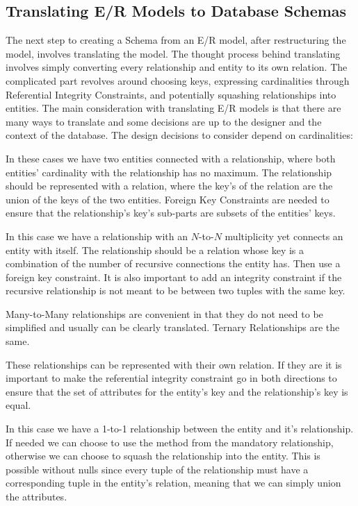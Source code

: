 \documentclass{report}
\begin{document}
\subsection{Translating E/R Models to Database Schemas}

The next step to creating a Schema from an E/R model, after restructuring the model, involves translating the model. The thought process behind translating involves simply converting every relationship and entity to its own relation. The complicated part revolves around choosing keys, expressing cardinalities through Referential Integrity Constraints, and potentially squashing relationships into entities. The main consideration with translating E/R models is that there are many ways to translate and some decisions are up to the designer and the context of the database. The design decisions to consider depend on cardinalities:

\begin{description}
    \item [Many-to-Many Relationships:] In these cases we have two entities connected with a relationship, where both entities' cardinality with the relationship has no maximum. The relationship should be represented with a relation, where the key's of the relation are the union of the keys of the two entities. Foreign Key Constraints are needed to ensure that the relationship's key's sub-parts are subsets of the entities' keys. 
    \item [Many-to-Many Recursive Relationships:] In this case we have a relationship with an $N$-to-$N$ multiplicity yet connects an entity with itself. The relationship should be a relation whose key is a combination of the number of recursive connections the entity has. Then use a foreign key constraint. It is also important to add an integrity constraint if the recursive relationship is not meant to be between two tuples with the same key. 
    \item \begin{note}
        Many-to-Many relationships are convenient in that they do not need to be simplified and usually can be clearly translated. Ternary Relationships are the same.
    \end{note}
    \item [Mandatory Relationships:] These relationships can be represented with their own relation. If they are it is important to make the referential integrity constraint go in both directions to ensure that the set of attributes for the entity's key and the relationship's key is equal. 
    \item [(1,1) Cardinality:] In this case we have a 1-to-1 relationship between the entity and it's relationship. If needed we can choose to use the method from the mandatory relationship, otherwise we can choose to squash the relationship into the entity. This is possible without nulls since every tuple of the relationship must have a corresponding tuple in the entity's relation, meaning that we can simply union the attributes.
\end{description}
\end{document}
